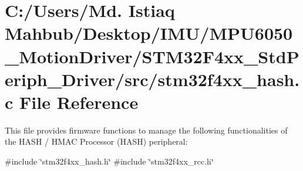 \section{C\+:/\+Users/\+Md. Istiaq Mahbub/\+Desktop/\+I\+M\+U/\+M\+P\+U6050\+\_\+\+Motion\+Driver/\+S\+T\+M32\+F4xx\+\_\+\+Std\+Periph\+\_\+\+Driver/src/stm32f4xx\+\_\+hash.c File Reference}
\label{stm32f4xx__hash_8c}


This file provides firmware functions to manage the following functionalities of the H\+A\+SH / H\+M\+AC Processor (H\+A\+SH) peripheral\+:  


{\ttfamily \#include \char`\"{}stm32f4xx\+\_\+hash.\+h\char`\"{}}\newline
{\ttfamily \#include \char`\"{}stm32f4xx\+\_\+rcc.\+h\char`\"{}}\newline
